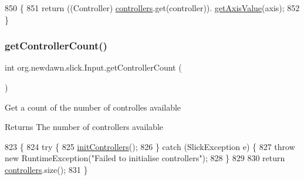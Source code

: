 \begin{DoxyCode}
850                                                         \{
851         \textcolor{keywordflow}{return} ((Controller) \mbox{\hyperlink{classorg_1_1newdawn_1_1slick_1_1_input_a1bcc91bf0db9efc578bd934a8ed9ce67}{controllers}}.get(controller)).
      \mbox{\hyperlink{classorg_1_1newdawn_1_1slick_1_1_input_ad9bfc0d7d50ac52a8e6f0cca6a8e470b}{getAxisValue}}(axis);
852     \}
\end{DoxyCode}
\mbox{\label{classorg_1_1newdawn_1_1slick_1_1_input_a4a81c87f7d16d49471106d7fbaa0989d}} 
\subsubsection{\texorpdfstring{get\+Controller\+Count()}{getControllerCount()}}
{\footnotesize\ttfamily int org.\+newdawn.\+slick.\+Input.\+get\+Controller\+Count (\begin{DoxyParamCaption}{ }\end{DoxyParamCaption})\hspace{0.3cm}{\ttfamily [inline]}}

Get a count of the number of controlles available

\begin{DoxyReturn}{Returns}
The number of controllers available 
\end{DoxyReturn}

\begin{DoxyCode}
823                                     \{
824         \textcolor{keywordflow}{try} \{
825             \mbox{\hyperlink{classorg_1_1newdawn_1_1slick_1_1_input_ab570b66f776cd2148c7ccf026dfd9b08}{initControllers}}();
826         \} \textcolor{keywordflow}{catch} (SlickException e) \{
827             \textcolor{keywordflow}{throw} \textcolor{keyword}{new} RuntimeException(\textcolor{stringliteral}{"Failed to initialise controllers"});
828         \}
829         
830         \textcolor{keywordflow}{return} \mbox{\hyperlink{classorg_1_1newdawn_1_1slick_1_1_input_a1bcc91bf0db9efc578bd934a8ed9ce67}{controllers}}.size();
831     \}
\end{DoxyCode}
\mbox{\label{classorg_1_1newdawn_1_1slick_1_1_input_a9bc5a2712c000d451becb5107ca4d5b4}} 
